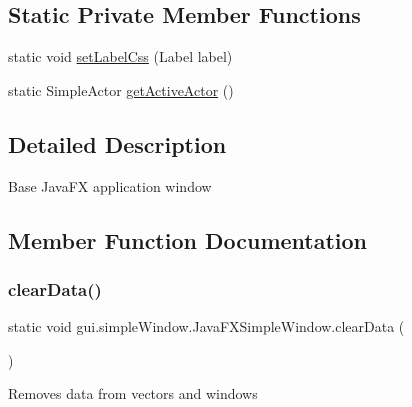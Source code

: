 \subsection*{Static Private Member Functions}
\begin{DoxyCompactItemize}
\item 
static void \hyperlink{classgui_1_1simple_window_1_1_java_f_x_simple_window_ac961e4a8db3e39626f5862f7d9793de7}{set\+Label\+Css} (Label label)
\item 
static Simple\+Actor \hyperlink{classgui_1_1simple_window_1_1_java_f_x_simple_window_ab78796ce0d97c16afb468a84f8b7726c}{get\+Active\+Actor} ()
\end{DoxyCompactItemize}


\subsection{Detailed Description}
Base Java\+FX application window 

\subsection{Member Function Documentation}
\mbox{\label{classgui_1_1simple_window_1_1_java_f_x_simple_window_a5e73d1d6c1d7f6ad7e262d40e41b8a39}} 
\subsubsection{\texorpdfstring{clear\+Data()}{clearData()}}
{\footnotesize\ttfamily static void gui.\+simple\+Window.\+Java\+F\+X\+Simple\+Window.\+clear\+Data (\begin{DoxyParamCaption}{ }\end{DoxyParamCaption})\hspace{0.3cm}{\ttfamily [static]}}

Removes data from vectors and windows \mbox{\label{classgui_1_1simple_window_1_1_java_f_x_simple_window_a8e476138f5131bf777c43baaa51d7028}} 
